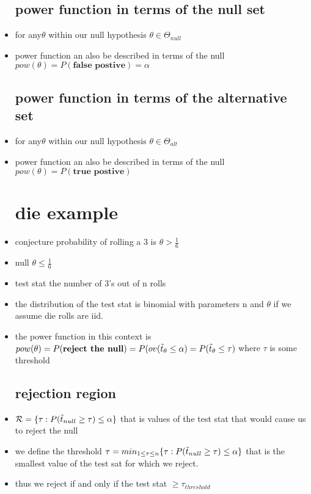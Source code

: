 \documentclass{article}
\begin{document}
\begin{itemize}
\subsection{power function in terms of the null set}
\item for any$\theta$ within our null hypothesis $\theta \in \Theta_{null}$
\item power function an also be described in terms of the null $pow(\theta)=P(\textbf{false postive})=\alpha$
\subsection{power function in terms of the alternative set }
\item for any$\theta$ within our null hypothesis $\theta \in \Theta_{alt}$
\item power function an also be described in terms of the null $pow(\theta)=P(\textbf{true postive})$
\section{die example}
\item conjecture probability of rolling a 3 is $\theta>\frac{1}{6}$
\item null $\theta\leq \frac{1}{6}$
\item test stat the number of 3's out of n rolls
\item the distribution of the test stat is binomial with parameters n and $\theta$ if we assume die rolls are iid. 
\item the power function in this context is $pow(\theta)=P(\textbf{reject the null}) = P(ov(\Tilde{t}_{\theta}\leq \alpha)=P(\Tilde{t}_{\theta}\leq \tau)$ where $\tau$ is some threshold 
\subsection{rejection region}
\item $\mathcal{R}=\{ \tau:P(\Tilde{t}_{null}\geq\tau)\leq \alpha \}$ that is values of the test stat that would cause us to reject the null 
\item we define the  threshold $\tau=min_{1\leq \tau \leq n}\{ \tau:P(\Tilde{t}_{null}\geq\tau)\leq \alpha \}$ that is the smallest value of the test sat for which we reject. 
\item thus we reject if and only if the test stat $\geq \tau_{threshold}$


\end{itemize}
\end{document}
